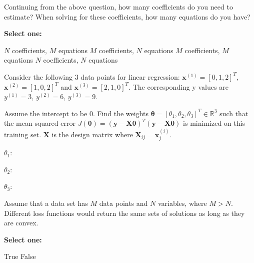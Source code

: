 \documentclass[11pt,addpoints,answers]{exam}
\numberwithin{equation}{section} %
\numberwithin{figure}{section} %
\numberwithin{table}{section} %
\newcommand{\xv}{\mathbf{x}}
\newcommand{\yv}{\mathbf{y}}
\newcommand{\Xv}{\mathbf{X}}
\newcommand{\thetav     }{\boldsymbol \theta     }
\begin{document}
\begin{questions}
    
    
    \clearpage
    
    \question[3] Continuing from the above question, how many coefficients do you need to estimate? When solving for these coefficients, how many equations do you have?
    
    \textbf{Select one:}
    \begin{checkboxes}
        \choice $N$ coefficients, $M$ equations
        \CorrectChoice $M$ coefficients, $N$ equations
        \choice $M$ coefficients, $M$ equations
        \choice $N$ coefficients, $N$ equations
    \end{checkboxes}
    
    
    \question[3] Consider the following 3 data points for linear regression: $\xv^{(1)} = [0, 1, 2]^T$, $\xv^{(2)} = [1, 0, 2]^T$ and $\xv^{(3)} = [2, 1, 0]^T$. The corresponding y values are $y^{(1)}=3$, $y^{(2)}=6$, $y^{(3)}=9$.
    
    Assume the intercept to be 0. Find the weights $\thetav = [\theta_1,  \theta_2,  \theta_3]^T \in \mathbb{R}^3$ such that the mean squared error $J(\thetav) = (\mathbf{\yv} - \Xv \thetav)^T(\mathbf{\yv} - \Xv \thetav)$ is minimized on this training set. $\Xv$ is the design matrix where $\Xv_{ij} = \xv_j^{(i)}$. 
    
    $\theta_1$: \quad
    \begin{tcolorbox}[fit,height=1cm, width=4cm, blank, borderline={1pt}{-2pt},nobeforeafter, top=2pt, left=2pt, right=2pt, bottom=2pt]
    \end{tcolorbox}
    
    
    $\theta_2$: \quad
    \begin{tcolorbox}[fit,height=1cm, width=4cm, blank, borderline={1pt}{-2pt},nobeforeafter, top=2pt, left=2pt, right=2pt, bottom=2pt]
    \end{tcolorbox}
    
    
    $\theta_3$: \quad
    \begin{tcolorbox}[fit,height=1cm, width=4cm, blank, borderline={1pt}{-2pt},nobeforeafter, top=2pt, left=2pt, right=2pt, bottom=2pt]
    \end{tcolorbox}
    
    

    \question[2] Assume that a data set has $M$ data points and $N$ variables, where $M>N$. Different loss functions would return the same sets of solutions as long as they are convex.
    
    \textbf{Select one:}
    \begin{checkboxes}
        \CorrectChoice True
        \choice False
    \end{checkboxes}
    

\end{questions}
\end{document}
